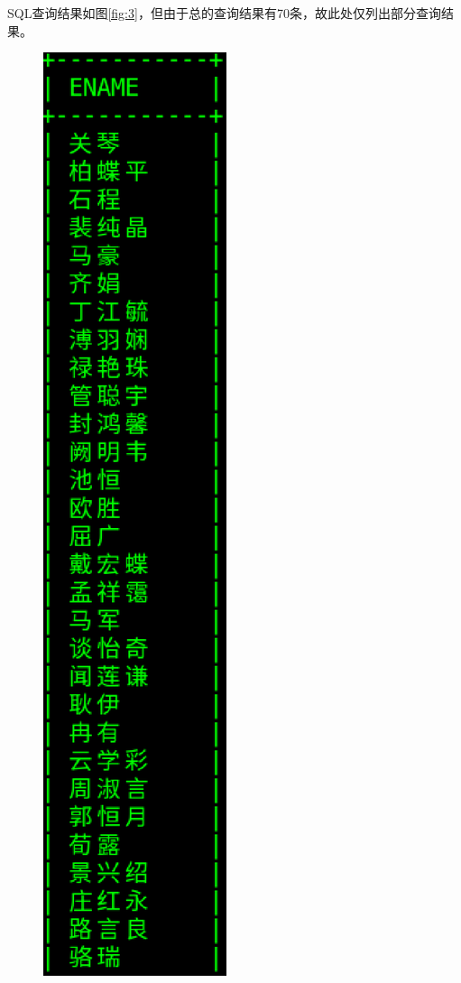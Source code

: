 \documentclass{ML}
\begin{document}
\begin{enumerate}
    SQL查询结果如图\ref{fig:3}，但由于总的查询结果有70条，故此处仅列出部分查询结果。
    \begin{figure}[htb]
        \centering
        \includegraphics[scale=0.4, bb=0 0 147 726]{media/3.1.3.eps}

\end{figure}
\end{enumerate}
\end{document}
